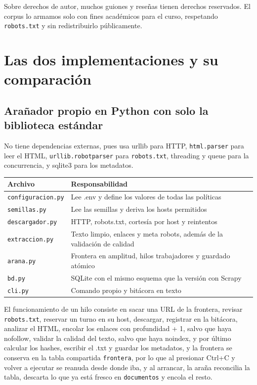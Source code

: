 \documentclass[11pt,spanish]{article}
\begin{document}
Sobre derechos de autor, muchos guiones y reseñas tienen derechos reservados. El corpus lo armamos solo con fines académicos para el curso, respetando \texttt{robots.txt} y sin redistribuirlo públicamente.

\section{Las dos implementaciones y su comparación}

\subsection{Arañador propio en Python con solo la biblioteca estándar}

No tiene dependencias externas, pues usa urllib para HTTP, \texttt{html.parser} para leer el HTML, \texttt{urllib.robotparser} para \texttt{robots.txt}, threading y queue para la concurrencia, y sqlite3 para los metadatos.

\begin{center}
\begin{tabularx}{\linewidth}{lY}
\toprule
\textbf{Archivo} & \textbf{Responsabilidad} \\
\midrule
\texttt{configuracion.py} & Lee .env y define los valores de todas las políticas \\
\texttt{semillas.py} & Lee las semillas y deriva los hosts permitidos \\
\texttt{descargador.py} & HTTP, robots.txt, cortesía por host y reintentos \\
\texttt{extraccion.py} & Texto limpio, enlaces y meta robots, además de la validación de calidad \\
\texttt{arana.py} & Frontera en amplitud, hilos trabajadores y guardado atómico \\
\texttt{bd.py} & SQLite con el mismo esquema que la versión con Scrapy \\
\texttt{cli.py} & Comando propio y bitácora en texto \\
\bottomrule
\end{tabularx}
\end{center}

El funcionamiento de un hilo consiste en sacar una URL de la frontera, revisar \texttt{robots.txt}, reservar un turno en su host, descargar, registrar en la bitácora, analizar el HTML, encolar los enlaces con profundidad + 1, salvo que haya nofollow, validar la calidad del texto, salvo que haya noindex, y por último calcular los hashes, escribir el .txt y guardar los metadatos, y la frontera se conserva en la tabla compartida \texttt{frontera}, por lo que al presionar Ctrl+C y volver a ejecutar se reanuda desde donde iba, y al arrancar, la araña reconcilia la tabla, descarta lo que ya está fresco en \texttt{documentos} y encola el resto.
\end{document}
